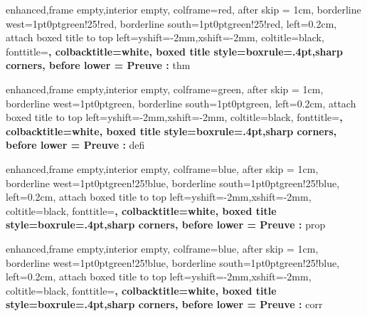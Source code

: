 \newcommand{\providetcbcountername}[1]{%
  \@ifundefined{c@tcb@cnt@#1}{%
    --undefined--%
  }{%
    tcb@cnt@#1%
  }
}

\newcommand{\settcbcounter}[2]{%
  \@ifundefined{c@tcb@cnt@#1}{%
    \GenericError{Error}{counter name #1 is no tcb counter }{}{}%
  }{%
    \setcounter{tcb@cnt@#1}{#2}%
   }%
}%

\newcommand{\displaytcbcounter}[1]{%
  \@ifundefined{thetcb@cnt@#1}{%
    \GenericError{Error}{counter name #1 is no tcb counter }{}{}%
  }{%
    \csname thetcb@cnt@#1\endcsname%
  }%
}

{
    enhanced,frame empty,interior empty,
    colframe=red,
    after skip = 1cm,
    borderline west={1pt}{0pt}{green!25!red},
    borderline south={1pt}{0pt}{green!25!red},
    left=0.2cm,
    attach boxed title to top left={yshift=-2mm,xshift=-2mm},
    coltitle=black,
    fonttitle=\bfseries,
    colbacktitle=white,
    boxed title style={boxrule=.4pt,sharp corners},
    before lower = {\textbf{Preuve :}\n}
}{thm}

{
    enhanced,frame empty,interior empty,
    colframe=green,
    after skip = 1cm,
    borderline west={1pt}{0pt}{green},
    borderline south={1pt}{0pt}{green},
    left=0.2cm,
    attach boxed title to top left={yshift=-2mm,xshift=-2mm},
    coltitle=black,
    fonttitle=\bfseries,
    colbacktitle=white,
    boxed title style={boxrule=.4pt,sharp corners},
    before lower = {\textbf{Preuve :}\n}
}{defi}

{
    enhanced,frame empty,interior empty,
    colframe=blue,
    after skip = 1cm,
    borderline west={1pt}{0pt}{green!25!blue},
    borderline south={1pt}{0pt}{green!25!blue},
    left=0.2cm,
    attach boxed title to top left={yshift=-2mm,xshift=-2mm},
    coltitle=black,
    fonttitle=\bfseries,
    colbacktitle=white,
    boxed title style={boxrule=.4pt,sharp corners},
    before lower = {\textbf{Preuve :}\n}
}{prop}

{
    enhanced,frame empty,interior empty,
    colframe=blue,
    after skip = 1cm,
    borderline west={1pt}{0pt}{green!25!blue},
    borderline south={1pt}{0pt}{green!25!blue},
    left=0.2cm,
    attach boxed title to top left={yshift=-2mm,xshift=-2mm},
    coltitle=black,
    fonttitle=\bfseries,
    colbacktitle=white,
    boxed title style={boxrule=.4pt,sharp corners},
    before lower = {\textbf{Preuve :}\n}
}{corr}

